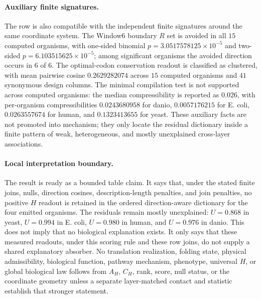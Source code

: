 \paragraph{Auxiliary finite signatures.}
The row is also compatible with the independent finite signatures around the same coordinate system.  The Window6 boundary $R$ set is avoided in all $15$ computed organisms, with one-sided binomial $p=3.0517578125\times 10^{-5}$ and two-sided $p=6.103515625\times 10^{-5}$; among significant organisms the avoided direction occurs in $6$ of $6$.  The optimal-codon conservation readout is classified as clustered, with mean pairwise cosine $0.2629282074$ across $15$ computed organisms and $41$ synonymous design columns.  The minimal compilation test is not supported across computed organisms: the median compressibility is reported as $0.026$, with per-organism compressibilities $0.0243680958$ for danio, $0.0057176215$ for E. coli, $0.0263557674$ for human, and $0.1323413655$ for yeast.  These auxiliary facts are not promoted into mechanism; they only locate the residual dictionary inside a finite pattern of weak, heterogeneous, and mostly unexplained cross-layer associations.

\paragraph{Local interpretation boundary.}
The result is ready as a bounded table claim.  It says that, under the stated finite joins, nulls, direction cosines, description-length penalties, and join penalties, no positive $H$ readout is retained in the ordered direction-aware dictionary for the four emitted organisms.  The residuals remain mostly unexplained: $U=0.868$ in yeast, $U=0.994$ in E. coli, $U=0.980$ in human, and $U=0.976$ in danio.  This does not imply that no biological explanation exists.  It only says that these measured readouts, under this scoring rule and these row joins, do not supply a shared explanatory absorber.  No translation realization, folding state, physical admissibility, biological function, pathway mechanism, phenotype, universal $H$, or global biological law follows from $A_H$, $C_H$, rank, score, null status, or the coordinate geometry unless a separate layer-matched contact and statistic establish that stronger statement.